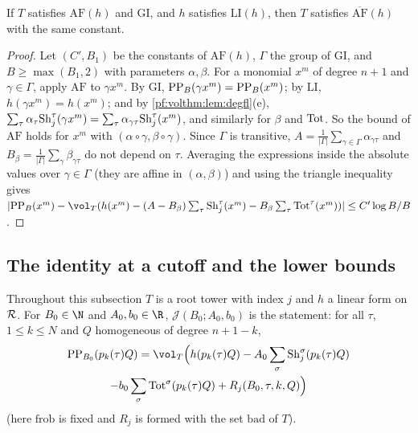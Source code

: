 \begin{proposition}\label{pf:volthm:prop:ThmBA}
If $T$ satisfies $\mathrm{AF}(h)$ and $\mathrm{GI}$, and $h$ satisfies $\mathrm{LI}(h)$, then $T$
satisfies $\overline{\mathrm{AF}}(h)$ with the same constant.
\end{proposition}

\begin{proof}
Let $(C',B_1)$ be the constants of $\mathrm{AF}(h)$, $\Gamma$ the group of $\mathrm{GI}$, and $B\ge\max(B_1,2)$
with parameters $\alpha,\beta$. For a monomial $x^m$ of degree $n+1$ and $\gamma\in\Gamma$, apply $\mathrm{AF}$ to
$\gamma x^m$. By $\mathrm{GI}$, $\mathrm{PP}_B(\gamma x^m)=\mathrm{PP}_B(x^m)$; by $\mathrm{LI}$,
$h(\gamma x^m)=h(x^m)$; and by \cref{pf:volthm:lem:degfl}(e),
$\sum_\tau\alpha_\tau\mathrm{Sh}_j^\tau(\gamma x^m)=\sum_\tau\alpha_{\gamma\tau}\mathrm{Sh}_j^\tau(x^m)$, and similarly for
$\beta$ and $\mathrm{Tot}$. So the bound of $\mathrm{AF}$ holds for $x^m$ with $(\alpha\circ\gamma,\beta\circ\gamma)$.
Since $\Gamma$ is transitive, $A=\frac1{|\Gamma|}\sum_{\gamma\in\Gamma}\alpha_{\gamma\tau}$ and
$B_\beta=\frac1{|\Gamma|}\sum_\gamma\beta_{\gamma\tau}$ do not depend on $\tau$. Averaging the expressions inside
the absolute values over $\gamma\in\Gamma$ (they are affine in $(\alpha,\beta)$) and using the triangle inequality
gives
$|\volthmPP_B(x^m)-\vol_T(h(x^m)-(A-B_\beta)\sum_\tau\volthmSh_j^\tau(x^m)-B_\beta\sum_\tau\volthmTot^\tau(x^m))|\le
C'\log B/B$.
\end{proof}

\subsection{The identity at a cutoff and the lower bounds}\label{pf:volthm:sec:lower}

Throughout this subsection $T$ is a root tower with index $j$ and $h$ a linear form on $\mathcal{R}$. For $B_0\in\N$
and $A_0,b_0\in\R$, $\mathcal J(B_0;A_0,b_0)$ is the statement: for all $\tau$, $1\le k\le N$ and $Q$
homogeneous of degree $n+1-k$,
\begin{multline}\label{pf:volthm:eq:ident}
\volthmPP_{B_0}(p_k(\tau)Q)=\vol_T\Bigl(h(p_k(\tau)Q)-A_0\sum_\sigma\volthmSh_j^\sigma(p_k(\tau)Q)\\
-b_0\sum_\sigma\volthmTot^\sigma(p_k(\tau)Q)+R_j(B_0,\tau,k,Q)\Bigr)
\end{multline}
(here $\mathrm{frob}$ is fixed and $R_j$ is formed with the set $\mathrm{bad}$ of $T$).

